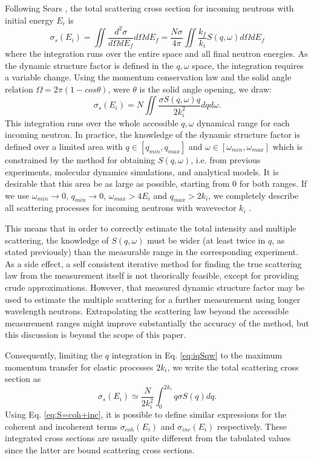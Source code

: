 Following Sears \cite{Sears75}, the total scattering cross section for incoming neutrons with initial energy $E_i$ is
\begin{equation}
\label{eq:iisigma}
\sigma_s(E_i) = \iint \frac{d^2 \sigma}{d\Omega dE_f} d\Omega dE_f = \frac{N \sigma}{4\pi} \iint \frac{k_f}{k_i} S(q, \omega) d\Omega dE_f
\end{equation}
where the integration runs over the entire space and all final neutron energies.
As the dynamic structure factor is defined in the $q,\omega$ space, the integration requires a variable change. Using the momentum conservation law and the solid angle relation $\Omega=2\pi(1-cos \theta)$, were $\theta$ is the solid angle opening, we draw:
\begin{equation}
\label{eq:iqSqw}
\sigma_s(E_i) = N \iint \frac{\sigma S(q,\omega) q}{2 k_i^2} dq d\omega.
\end{equation}
This integration runs over the whole accessible $q,\omega$ dynamical range for each incoming neutron.
In practice, the knowledge of the dynamic structure factor is defined over a limited area with $q \in [q_{min}, q_{max}]$ and $\omega \in [\omega_{min}, \omega_{max}]$ which is constrained by the method for obtaining $S(q,\omega)$, i.e. from previous experiments, molecular dynamics simulations, and analytical models. It is desirable that this area be as large as possible, starting from 0 for both ranges. If we use $\omega_{min} \rightarrow 0$, $q_{min} \rightarrow 0$, $\omega_{max} > 4E_i$ and $q_{max} > 2k_i$, we completely describe all scattering processes for incoming neutrons with wavevector $k_i$ \cite{msc}.

This means that in order to correctly estimate the total intensity and multiple scattering, the knowledge of $S(q,\omega)$ must be wider (at least twice in $q$, as stated previously) than the measurable range in the corresponding experiment.
As a side effect, a self consistent iterative method for finding the true scattering law from the measurement itself is not theorically feasible, except for providing crude approximations.
However, that measured dynamic structure factor may be used to estimate the multiple scattering for a further measurement using longer wavelength neutrons.
Extrapolating the scattering law beyond the accessible measurement ranges might improve substantially the accuracy of the method, but this discussion is beyond the scope of this paper.

Consequently, limiting the $q$ integration in Eq. \ref{eq:iqSqw} to the maximum momentum transfer for elastic processes $2 k_i$, we write the total scattering cross section as
\begin{equation}
\label{eq:iqSq}
\sigma_s(E_i) \simeq \frac{N}{2 k_i^2} \int_0^{2k_i} q \sigma S(q) dq.
\end{equation}
Using Eq. \ref{eq:S=coh+inc}, it is possible to define similar expressions for the coherent and incoherent terms $\sigma_{coh}(E_i)$ and $\sigma_{inc}(E_i)$ respectively. These integrated cross sections are usually quite different from the tabulated values \cite{ILLblue} since the latter are bound scattering cross sections.

